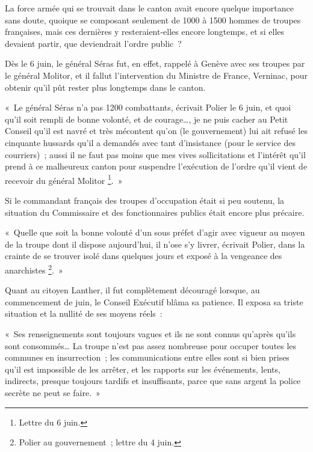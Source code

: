 \documentclass[french,twoside]{book} %
\newenvironment{quoteblock}%
  {\begin{quoting}}
  {\end{quoting}}
\newenvironment{quotebar}{%
    \def\FrameCommand{{\color{rubric!10!}\vrule width 0.5em} \hspace{0.9em}}%
    \def\OuterFrameSep{\itemsep} %
    \MakeFramed {\advance\hsize-\width \FrameRestore}
  }%
  {%
    \endMakeFramed
  }
\renewenvironment{quoteblock}%
  {%
    \savenotes
    \setstretch{0.9}
    \normalfont
    \begin{quotebar}
  }
  {%
    \end{quotebar}
    \spewnotes
  }
\begin{document}
La force armée qui se trouvait dans le canton avait encore quelque importance sans doute, quoique se composant seulement de 1000 à 1500 hommes de troupes françaises, mais ces dernières y resteraient-elles encore longtemps, et si elles devaient partir, que deviendrait l’ordre public ?\par
Dès le 6 juin, le général Séras fut, en effet, rappelé à Genève avec ses troupes par le général Molitor, et il fallut l’intervention du Ministre de France, Verninac, pour obtenir qu’il pût rester plus longtemps dans le canton.\par

\begin{quoteblock}
 \noindent « Le général Séras n’a pas 1200 combattants, écrivait Polier le 6 juin, et quoi qu’il soit rempli de bonne volonté, et de courage…, je ne puis cacher au Petit Conseil qu’il est navré et très mécontent qu’on (le gouvernement) lui ait refusé les cinquante hussards qu’il a demandés avec tant d’insistance (pour le service des courriers) ; aussi il ne faut pas moins que mes vives sollicitations et l’intérêt qu’il prend à ce malheureux canton pour suspendre l’exécution de l’ordre qu’il vient de recevoir du général Molitor \footnote{Lettre du 6 juin.}. »
 \end{quoteblock}

\noindent Si le commandant français des troupes d’occupation était si peu soutenu, la situation du Commissaire et des fonctionnaires publics était encore plus précaire.\par

\begin{quoteblock}
 \noindent « Quelle que soit la bonne volonté d’un sous préfet d’agir avec vigueur au moyen de la troupe dont il dispose aujourd’hui, il n’ose s’y livrer, écrivait Polier, dans la crainte de se trouver isolé dans quelques jours et exposé à la vengeance des anarchistes \footnote{Polier au gouvernement ; lettre du 4 juin.}. »
 \end{quoteblock}

\noindent Quant au citoyen Lanther, il fut complètement découragé lorsque, au commencement de juin, le Conseil Exécutif blâma sa patience. Il exposa sa triste situation et la nullité de ses moyens réels :\par

\begin{quoteblock}
\noindent « Ses renseignements sont toujours vagues et ils ne sont connus qu’après qu’ils sont consommés… La troupe n’est pas assez nombreuse pour occuper toutes les communes en insurrection ; les communications entre elles sont si bien prises qu’il est impossible de les arrêter, et les rapports sur les événements, lents, indirects, presque toujours tardifs et insuffisants, parce que sans argent la police secrète ne peut se faire. »\end{quoteblock}
\end{document}
